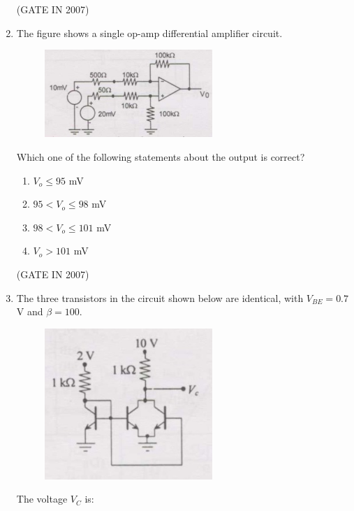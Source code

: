 \documentclass[journal]{IEEEtran}
\begin{document}
\begin{enumerate}
\hfill(GATE IN 2007)

\item The figure shows a single op-amp differential amplifier circuit.
\begin{figure}[H]
    \centering
      \includegraphics[width=0.6\textwidth]{30.jpg} 
      \caption{}
    \label{fig:fig30} 
\end{figure}
Which one of the following statements about the output is correct?

\begin{multicols}{2}
\begin{enumerate}
    \item $V_o \leq 95$ mV
    \item $95 < V_o \leq 98$ mV
    \item $98 < V_o \leq 101$ mV
    \item $V_o > 101$ mV
\end{enumerate}
\end{multicols}
\hfill(GATE IN 2007)
\item The three transistors in the circuit shown below are identical, with $V_{BE} = 0.7$ V and $\beta = 100$. 
\begin{figure}[H]
    \centering
      \includegraphics[width=0.6\textwidth]{31.jpg} 
      \caption{}
    \label{fig:fig31} 
\end{figure}
The voltage $V_C$ is:


\end{enumerate}
\end{document}
